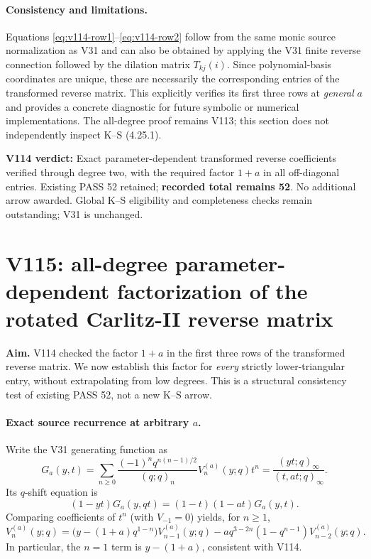 \documentclass[11pt]{article}
\begin{document}
\paragraph{Consistency and limitations.}
Equations \eqref{eq:v114-row1}--\eqref{eq:v114-row2} follow from the same monic source normalization as V31 and can also be obtained by applying the V31 finite reverse connection followed by the dilation matrix $T_{kj}(i)$. Since polynomial-basis coordinates are unique, these are necessarily the corresponding entries of the transformed reverse matrix. This explicitly verifies its first three rows at \emph{general} $a$ and provides a concrete diagnostic for future symbolic or numerical implementations. The all-degree proof remains V113; this section does not independently inspect K--S (4.25.1).

\noindent\textbf{V114 verdict:} Exact parameter-dependent transformed reverse coefficients verified through degree two, with the required factor $1+a$ in all off-diagonal entries. Existing PASS 52 retained; \textbf{recorded total remains 52}. No additional arrow awarded. Global K--S eligibility and completeness checks remain outstanding; V31 is unchanged.



\clearpage
\section{V115: all-degree parameter-dependent factorization of the rotated Carlitz-II reverse matrix}
\noindent\textbf{Aim.} V114 checked the factor $1+a$ in the first three rows of the transformed reverse matrix. We now establish this factor for \emph{every} strictly lower-triangular entry, without extrapolating from low degrees. This is a structural consistency test of existing PASS 52, not a new K--S arrow.

\paragraph{Exact source recurrence at arbitrary $a$.}
Write the V31 generating function as
\[
 G_a(y,t)=\sum_{n\ge0}\frac{(-1)^nq^{n(n-1)/2}}{(q;q)_n}V_n^{(a)}(y;q)t^n
 =\frac{(yt;q)_\infty}{(t,at;q)_\infty}.
\]
Its $q$-shift equation is
\[
 (1-yt)G_a(y,qt)=(1-t)(1-at)G_a(y,t).
\]
Comparing coefficients of $t^n$ (with $V_{-1}=0$) yields, for $n\ge1$,
\begin{equation}
 \boxed{V_n^{(a)}(y;q)=
 \bigl(y-(1+a)q^{1-n}\bigr)V_{n-1}^{(a)}(y;q)
 -a q^{3-2n}(1-q^{n-1})V_{n-2}^{(a)}(y;q).}
 \label{eq:v115-carlitz-rec}
\end{equation}
In particular, the $n=1$ term is $y-(1+a)$, consistent with V114.
\end{document}
